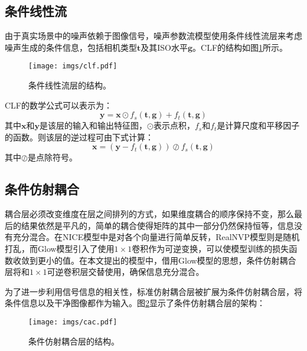 \subsection{条件线性流}

由于真实场景中的噪声依赖于图像信号，噪声参数流模型使用条件线性流层来考虑噪声生成的条件信息，包括相机类型$\boldsymbol{t}$及其ISO水平$\boldsymbol{g}$。CLF的结构如图\ref{fig:clf}所示。

\begin{figure}[h]
	\centering
	\texttt{[image: imgs/clf.pdf]}
	\caption{条件线性流层的结构。}
	\label{fig:clf}
\end{figure}

CLF的数学公式可以表示为：
\begin{equation}
	\boldsymbol{y}=\boldsymbol{x} \odot f_s(\boldsymbol{t}, \boldsymbol{g})+f_t(\boldsymbol{t}, \boldsymbol{g})
\end{equation}
其中$\boldsymbol{x}$和$\boldsymbol{y}$是该层的输入和输出特征图，$\odot$表示点积，$f_s$和$f_t$是计算尺度和平移因子的函数。则该层的逆过程可由下式计算：
\begin{equation}
	\boldsymbol{x}=\left(\boldsymbol{y}-f_t(\boldsymbol{t}, \boldsymbol{g})\right) \oslash f_s(\boldsymbol{t}, \boldsymbol{g})
	\label{clf}
\end{equation}
其中$\oslash$是点除符号。

\subsection{条件仿射耦合}

耦合层必须改变维度在层之间排列的方式，如果维度耦合的顺序保持不变，那么最后的结果依然是平凡的，简单的耦合使得矩阵的其中一部分仍然保持恒等，信息没有充分混合。在NICE模型中是对各个向量进行简单反转\cite{nice}，RealNVP模型则是随机打乱\cite{realnvp}，而Glow模型引入了使用$1 \times 1$卷积作为可逆变换\cite{glow}，可以使模型训练的损失函数收敛到更小的值。在本文提出的模型中，借用Glow模型的思想，条件仿射耦合层将和$1 \times 1$可逆卷积层交替使用，确保信息充分混合。

为了进一步利用信号信息的相关性，标准仿射耦合层\cite{realnvp}被扩展为条件仿射耦合层，将条件信息以及干净图像都作为输入。图\ref{fig:cac}显示了条件仿射耦合层的架构：

\begin{figure}[h]
	\centering
	\texttt{[image: imgs/cac.pdf]}
	\caption{条件仿射耦合层的结构。}
	\label{fig:cac}
\end{figure}

